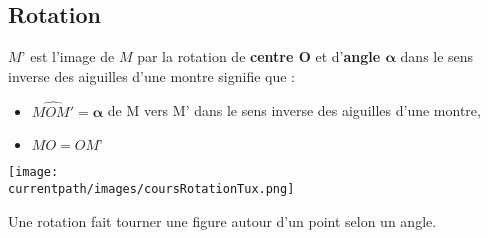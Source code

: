\subsection{Rotation}
\begin{definition}
    $M’$ est l’image de $M$ par la rotation de \textbf{centre $\mathbf{O}$} et d’\textbf{angle $\mathbf{\alpha}$} dans le sens inverse des aiguilles d’une montre signifie que : 
    \begin{itemize}
        \item $\widehat{MOM'}=\mathbf{\alpha}$ de M vers M’ dans le sens inverse des aiguilles d’une montre,
        \item $MO = OM’$
    \end{itemize}
\end{definition}

\begin{center}
    \texttt{[image: \\currentpath/images/coursRotationTux.png]}
\end{center}

\begin{remarque}
    Une rotation fait tourner une figure autour d’un point selon un angle.
    \begin{myBox}{}

    \end{myBox}
\end{remarque}


\begin{center}
\end{center}


